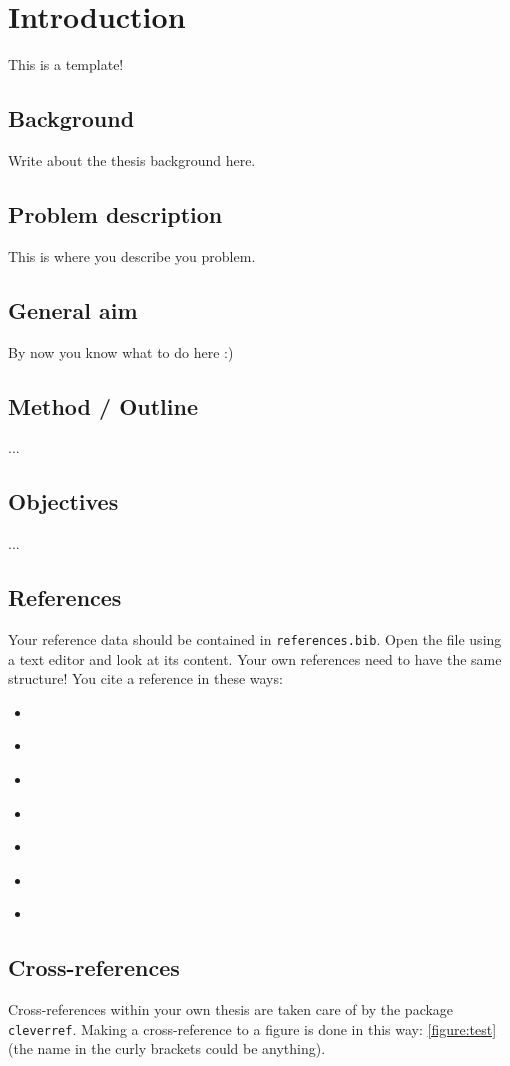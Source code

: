 \chapter{Introduction}
This is a template!

\section{Background}
Write about the thesis background here.
\section{Problem description}
This is where you describe you problem.
\section{General aim}
By now you know what to do here :)
\section{Method / Outline }
...

\section{Objectives}
...

\section{References}
Your reference data should be contained in \texttt{references.bib}. Open the file using a text editor and look at its content. Your own references need to have the same structure! You cite a reference in these ways:
\begin{itemize}
	\item \parencite[pre note][post note]{Harryson2014}
	\item \textcite[][Chapter~2]{Noren2006}
	\item \cite{Harryson2014}
	\item \citeauthor{Harryson2014}
	\item {}
	\item \cite{box1978,Harryson2014,matlab}
	\item \textcite{LectureA}
\end{itemize}

\section{Cross-references}
Cross-references within your own thesis are taken care of by the package \texttt{cleverref}. Making a cross-reference to a figure is done in this way: \cref{figure:test} (the name in the curly brackets could be anything).

